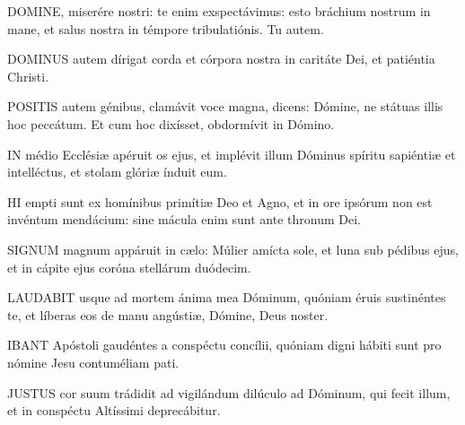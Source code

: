 

\lettrine[lines=2]{D}{OMINE}, miserére nostri: te enim exspectávimus: esto bráchium nostrum in mane, et salus nostra in témpore tribulatiónis. Tu autem.


\lettrine[lines=2]{D}{OMINUS} autem dírigat corda et córpora nostra in caritáte Dei, et patiéntia Christi.



\lettrine[lines=2]{P}{OSITIS} autem génibus, clamávit voce magna, dicens: Dómine, ne státuas illis hoc peccátum. Et cum hoc dixísset, obdormívit in Dómino.


\lettrine[lines=2]{I}{N} médio Ecclésiæ apéruit os ejus, et implévit illum Dóminus spíritu sapiéntiæ et intelléctus, et stolam glóriæ índuit eum.


\lettrine[lines=2]{H}{I} empti sunt ex homínibus primítiæ Deo et Agno, et in ore ipsórum non est invéntum mendácium: sine mácula enim sunt ante thronum Dei.



\lettrine[lines=2]{S}{IGNUM} magnum appáruit in cælo: Múlier amícta sole, et luna sub pédibus ejus, et in cápite ejus coróna stellárum duódecim.


\lettrine[lines=2]{L}{AUDABIT} usque ad mortem ánima mea Dóminum, quóniam éruis sustinéntes te, et líberas eos de manu angústiæ, Dómine, Deus noster.



\lettrine[lines=2]{I}{BANT} Apóstoli gaudéntes a conspéctu concílii, quóniam digni hábiti sunt pro nómine Jesu contuméliam pati.


\lettrine[lines=2]{J}{USTUS} cor suum trádidit ad vigilándum dilúculo ad Dóminum, qui fecit illum, et in conspéctu Altíssimi deprecábitur.

